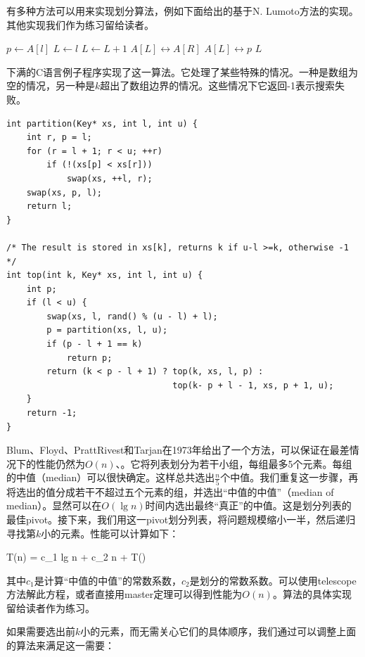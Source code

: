 \documentclass[UTF8]{article}
\begin{document}
有多种方法可以用来实现划分算法，例如下面给出的基于N. Lumoto方法的实现。其他实现我们作为练习留给读者。

\begin{algorithmic}[1]
  \State $p \gets A[l]$
  \State $L \gets l$
      \State $L \gets L + 1$
      \State {} $A[L] \leftrightarrow A[R]$
    \EndIf
  \EndFor
  \State {} $A[L] \leftrightarrow p$
  \State \Return $L$
\EndFunction
\end{algorithmic}

下满的C语言例子程序实现了这一算法。它处理了某些特殊的情况。一种是数组为空的情况，另一种是$k$超出了数组边界的情况。这些情况下它返回-1表示搜索失败。

\lstset{language=C}
\begin{lstlisting}
int partition(Key* xs, int l, int u) {
    int r, p = l;
    for (r = l + 1; r < u; ++r)
        if (!(xs[p] < xs[r]))
            swap(xs, ++l, r);
    swap(xs, p, l);
    return l;
}

/* The result is stored in xs[k], returns k if u-l >=k, otherwise -1 */
int top(int k, Key* xs, int l, int u) {
    int p;
    if (l < u) {
        swap(xs, l, rand() % (u - l) + l);
        p = partition(xs, l, u);
        if (p - l + 1 == k)
            return p;
        return (k < p - l + 1) ? top(k, xs, l, p) :
                                 top(k- p + l - 1, xs, p + 1, u);
    }
    return -1;
}
\end{lstlisting}

Blum、Floyd、PrattRivest和Tarjan在1973年给出了一个方法，可以保证在最差情况下的性能仍然为$O(n)$\cite{CLRS}、\cite{median-of-median}。它将列表划分为若干小组，每组最多5个元素。每组的中值（median）可以很快确定。这样总共选出$\frac{n}{5}$个中值。我们重复这一步骤，再将选出的值分成若干不超过五个元素的组，并选出“中值的中值”（median of median）。显然可以在$O(\lg n)$时间内选出最终“真正”的中值。这是划分列表的最佳pivot。接下来，我们用这一pivot划分列表，将问题规模缩小一半，然后递归寻找第$k$小的元素。性能可以计算如下：

\be
T(n) = c_1 lg n + c_2 n + T()
\ee

其中$c_1$是计算“中值的中值”的常数系数，$c_2$是划分的常数系数。可以使用telescope方法解此方程，或者直接用master定理\cite{CLRS}可以得到性能为$O(n)$。算法的具体实现留给读者作为练习。

如果需要选出前$k$小的元素，而无需关心它们的具体顺序，我们通过可以调整上面的算法来满足这一需要：
\end{document}
